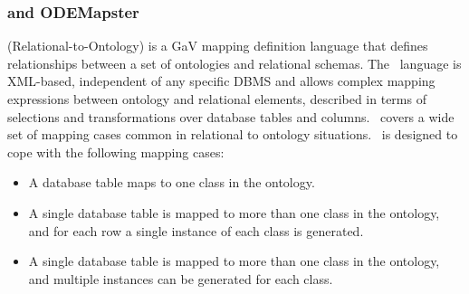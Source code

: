\subsubsection{\textit{\rtwoo} and ODEMapster}
\label{R2O}
\rtwoo(Relational-to-Ontology)\cite{Barrasa_04} is a GaV mapping definition language that defines relationships between a set of ontologies and relational schemas. The \rtwoo\ language is XML-based, independent of any specific DBMS and allows complex mapping expressions between ontology and relational elements, %
described in terms of selections and transformations over database tables and columns.
\rtwoo\ covers a wide set of mapping cases common in relational to ontology situations. \rtwoo\ is designed to cope
with the following mapping cases:
\begin{itemize}
\item A database table maps to one class in the ontology. %
\item A single database table is mapped to more than one class in the ontology, and for each row a single instance of each class is generated. %
\item A single database table is mapped to more than one class in the ontology, and multiple instances can be generated for each class. %
\end{itemize}

